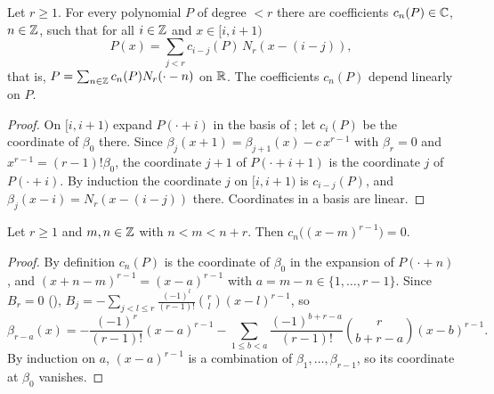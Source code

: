 \begin{theorem}
\label{thm:marsden}
\leanok
{}
Let $r \geq 1$. For every polynomial $P$ of degree $< r$ there are coefficients
$c_n(P) \in \mathbb{C}$, $n \in \mathbb{Z}$, such that for all $i \in \mathbb{Z}$ and $x \in [i, i+1)$
\[
  P(x) = \sum_{j < r} c_{i - j}(P) \, N_r(x - (i - j)) ,
\]
that is, $P = \sum_{n \in \mathbb{Z}} c_n(P) N_r(\cdot - n)$ on $\mathbb{R}$. The coefficients $c_n(P)$ depend
linearly on $P$.
\end{theorem}

\begin{proof}
\leanok
On $[i, i+1)$ expand $P(\cdot + i)$ in the basis of ; let $c_i(P)$ be the
coordinate of $\beta_0$ there. Since $\beta_j(x + 1) = \beta_{j+1}(x) - c\, x^{r-1}$ with
$\beta_r = 0$ and $x^{r-1} = (r-1)! \beta_0$, the coordinate $j + 1$ of $P(\cdot + i + 1)$ is the
coordinate $j$ of $P(\cdot + i)$. By induction the coordinate $j$ on $[i, i+1)$ is
$c_{i-j}(P)$, and $\beta_j(x - i) = N_r(x - (i - j))$ there. Coordinates in a basis are linear.
\end{proof}

\begin{lemma}
\label{lem:bspline-coef-powers}
\leanok
{}
Let $r \geq 1$ and $m, n \in \mathbb{Z}$ with $n < m < n + r$. Then $c_n\bigl((x - m)^{r-1}\bigr) = 0$.
\end{lemma}

\begin{proof}
\leanok
By definition $c_n(P)$ is the coordinate of $\beta_0$ in the expansion of $P(\cdot + n)$, and
$(x + n - m)^{r-1} = (x - a)^{r-1}$ with $a = m - n \in \{1, \dots, r - 1\}$. Since $B_r = 0$
(), $B_j = -\sum_{j < l \leq r} \frac{(-1)^l}{(r-1)!} \binom{r}{l}
(x - l)^{r-1}$, so
\[
  \beta_{r-a}(x) = -\frac{(-1)^r}{(r-1)!} (x - a)^{r-1}
    - \sum_{1 \leq b < a} \frac{(-1)^{b + r - a}}{(r-1)!} \binom{r}{b + r - a} (x - b)^{r-1} .
\]
By induction on $a$, $(x - a)^{r-1}$ is a combination of $\beta_1, \dots, \beta_{r-1}$, so its
coordinate at $\beta_0$ vanishes.
\end{proof}

